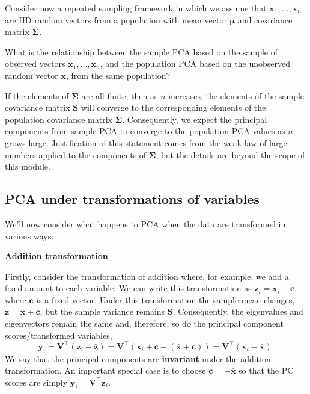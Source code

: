 \documentclass[
]{book}
\theoremstyle{definition}
\theoremstyle{definition}
\theoremstyle{definition}
\theoremstyle{definition}
\theoremstyle{remark}
\begin{document}
Consider now a repeated sampling framework in which we assume that \(\mathbf x_1, \ldots , \mathbf x_n\) are IID random vectors from a population
with mean vector \(\pmb \mu\) and covariance matrix \(\boldsymbol{\Sigma}\).

What is the relationship between the sample PCA based on the sample of observed vectors \(\mathbf x_1, \ldots , \mathbf x_n\), and the population PCA based on the unobserved random vector \(\mathbf x\),
from the same population?

If the elements of \(\boldsymbol{\Sigma}\) are all finite, then as \(n\) increases, the elements of the sample covariance matrix \(\mathbf S\) will converge to the corresponding elements
of the population covariance matrix \(\boldsymbol{\Sigma}\). Consequently, we expect the principal components from sample PCA to converge to the population PCA values as \(n\) grows large. Justification of this statement comes from the weak law of large numbers applied to the components of \(\boldsymbol{\Sigma}\), but the details are beyond the scope of this module.

\hypertarget{pca-under-transformations-of-variables}{%
\subsection{PCA under transformations of variables}\label{pca-under-transformations-of-variables}}

We'll now consider what happens to PCA when the data are transformed in various ways.

\textbf{Addition transformation}

Firstly, consider the transformation of addition where, for example, we add a fixed amount to each variable.
We can write this transformation as \(\mathbf z_i = \mathbf x_i + \mathbf c\), where \(\mathbf c\) is a fixed vector. Under this transformation the sample mean changes, \(\bar{\mathbf z} = \bar{\mathbf x} + \mathbf c\), but the sample variance remains \(\mathbf S\). Consequently, the eigenvalues and eigenvectors remain the same and, therefore, so do the principal component scores/transformed variables,
\[\mathbf y_i = \mathbf V^\top (\mathbf z_i - \bar{\mathbf z}) = \mathbf V^\top(\mathbf x_i + \mathbf c- (\bar{\mathbf x} + \mathbf c)) = \mathbf V^\top (\mathbf x_i - \bar{\mathbf x}).\]
We say that the principal components are \textbf{invariant} under the addition transformation. An important special case is to choose \(\mathbf c= -\bar{\mathbf x}\) so that the PC scores are simply \(\mathbf y_i = \mathbf V^\top \mathbf z_i\).
\end{document}

